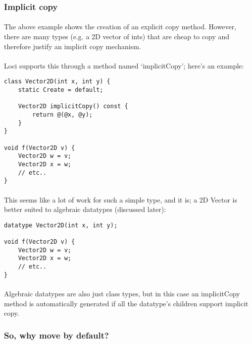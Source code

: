 \documentclass[12pt,twoside,notitlepage]{report}
\begin{document}
\subsubsection{Implicit copy}

\paragraph{}
The above example shows the creation of an explicit copy method. However, there are many types (e.g. a 2D vector of ints) that are cheap to copy and therefore justify an implicit copy mechanism.

\paragraph{}
Loci supports this through a method named `implicitCopy'; here’s an example:

\begin{lstlisting}
class Vector2D(int x, int y) {
	static Create = default;
	
	Vector2D implicitCopy() const {
		return @(@x, @y);
	}
}

void f(Vector2D v) {
	Vector2D w = v;
	Vector2D x = w;
	// etc..
}
\end{lstlisting}

\paragraph{}
This seems like a lot of work for such a simple type, and it is; a 2D Vector is better suited to algebraic datatypes (discussed later):

\begin{lstlisting}
datatype Vector2D(int x, int y);

void f(Vector2D v) {
	Vector2D w = v;
	Vector2D x = w;
	// etc..
}
\end{lstlisting}

\paragraph{}
Algebraic datatypes are also just class types, but in this case an implicitCopy method is automatically generated if all the datatype's children support implicit copy.

\subsubsection{So, why move by default?}
\end{document}
